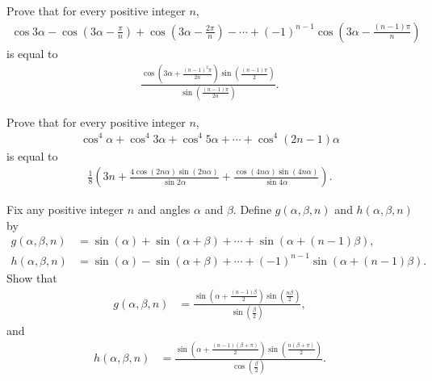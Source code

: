 \documentclass[12pt,a4paper]{memoir}
\theoremstyle{definition}
\begin{document}
\begin{question}
	Prove that for every positive integer $n$,
	\begin{align*}
		\cos 3\alpha - \cos\left(3\alpha-\frac{\pi}{n}\right) + \cos\left(3\alpha-\frac{2\pi}{n}\right) - \cdots + (-1)^{n-1} \cos\left(3\alpha-\frac{(n-1)\pi}{n}\right)
	\end{align*}
	is equal to
	\begin{align*}
		\frac{\displaystyle \cos\left(3\alpha+\frac{(n-1)^2\pi}{2n}\right)\sin\left(\frac{(n-1)\pi}{2}\right)}{\displaystyle \sin\left(\frac{(n-1)\pi}{2n}\right)}.
	\end{align*}
\end{question}



\begin{question}
	Prove that for every positive integer $n$,
	\begin{align*}
		\cos^4 \alpha + \cos^4 3\alpha + \cos^4 5\alpha + \cdots + \cos^4(2n-1)\alpha
	\end{align*}
	is equal to
	\begin{align*}
		\frac{1}{8}\left(3n+\frac{4\cos(2n\alpha)\sin(2n\alpha)}{\sin 2\alpha} + \frac{\cos(4n\alpha)\sin(4n\alpha)}{\sin 4\alpha} \right).
	\end{align*}
\end{question}




	\begin{question}[name=Sum of Sines of Angles in an AP]
		Fix any positive integer $n$ and angles $\alpha$ and $\beta$. Define $g(\alpha, \beta, n)$ and $h(\alpha,\beta,n)$ by
		\begin{align*}
			g(\alpha,\beta,n) &= \sin(\alpha) + \sin(\alpha+\beta) + \cdots + \sin(\alpha+(n-1)\beta),\\
			h(\alpha,\beta,n) &= \sin(\alpha) - \sin(\alpha+\beta) + \cdots + (-1)^{n-1}\sin(\alpha+(n-1)\beta).
		\end{align*}
		Show that
		\begin{align*}
			g(\alpha,\beta,n) &= \frac{\displaystyle\sin\left(\alpha+\frac{(n-1)\beta}{2}\right)\sin\left(\frac{n\beta}{2}\right)}{\displaystyle\sin\left(\frac{\beta}{2}\right)},
		\end{align*}
		and
		\begin{align*}
			h(\alpha,\beta,n) &= \frac{\displaystyle\sin\left(\alpha+\frac{(n-1)(\beta+\pi)}{2}\right)\sin\left(\frac{n(\beta+\pi)}{2}\right)}{\displaystyle\cos\left(\frac{\beta}{2}\right)}.            
		\end{align*}
	\end{question}
\end{document}
